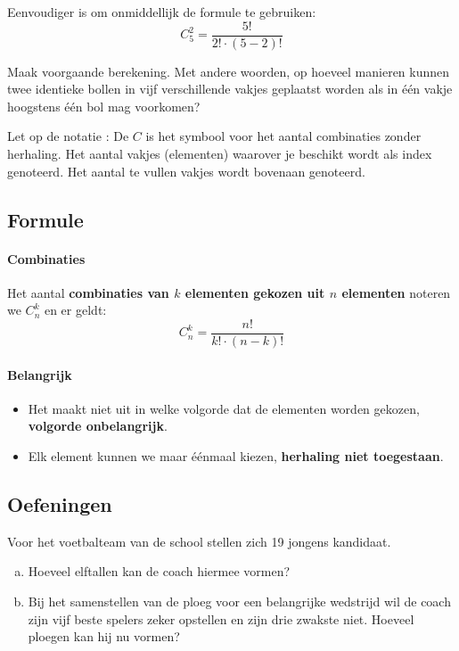 \documentclass[12pt,twoside]{article}
\begin{document}
\begin{theorie}
Eenvoudiger is om onmiddellijk de formule te gebruiken:
$$C^2_5=\dfrac{5!}{2!\cdot (5-2)!}$$

Maak voorgaande berekening. Met andere woorden, op hoeveel manieren kunnen twee identieke bollen in vijf verschillende vakjes geplaatst worden als in één vakje hoogstens één bol mag voorkomen?

Let op de notatie : De $C$ is het symbool voor het aantal combinaties zonder
herhaling. Het aantal vakjes (elementen) waarover je beschikt wordt als index
genoteerd. Het aantal te vullen vakjes wordt bovenaan genoteerd.

\subsection{Formule}

\paragraph*{Combinaties}
\begin{mdframed}
Het aantal {\bf combinaties van $k$ elementen gekozen uit $n$ elementen} noteren we $C^k_n$ en er geldt:
$$C^k_n=\dfrac{n!}{k!\cdot(n-k)!}$$
\end{mdframed}

\paragraph*{Belangrijk}
\begin{itemize}
  \item Het maakt niet uit in welke volgorde dat de elementen worden gekozen, {\bf volgorde onbelangrijk}.
  \item Elk element kunnen we maar éénmaal kiezen, {\bf herhaling niet toegestaan}.
\end{itemize}

\pagebreak
\subsection{Oefeningen}

\end{theorie}

\begin{oefening}
Voor het voetbalteam van de school stellen zich 19 jongens kandidaat.
\begin{enumerate}[(a)]
  \item Hoeveel elftallen kan de coach hiermee vormen?
  \item Bij het samenstellen van de ploeg voor een belangrijke wedstrijd wil de coach zijn vijf beste spelers zeker opstellen en zijn drie zwakste niet. Hoeveel ploegen kan hij nu vormen?
\end{enumerate}
\end{oefening}
\end{document}
